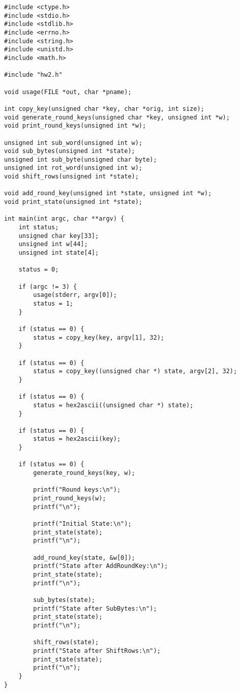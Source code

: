 \documentclass[a4paper]{report}
\begin{document}
\begin{lstlisting}
#include <ctype.h>
#include <stdio.h>
#include <stdlib.h>
#include <errno.h>
#include <string.h>
#include <unistd.h>
#include <math.h>

#include "hw2.h"

void usage(FILE *out, char *pname);

int copy_key(unsigned char *key, char *orig, int size);
void generate_round_keys(unsigned char *key, unsigned int *w);
void print_round_keys(unsigned int *w);

unsigned int sub_word(unsigned int w);
void sub_bytes(unsigned int *state);
unsigned int sub_byte(unsigned char byte);
unsigned int rot_word(unsigned int w);
void shift_rows(unsigned int *state);

void add_round_key(unsigned int *state, unsigned int *w);
void print_state(unsigned int *state);

int main(int argc, char **argv) {
    int status;
    unsigned char key[33];
    unsigned int w[44];
    unsigned int state[4];

    status = 0;

    if (argc != 3) {
        usage(stderr, argv[0]);
        status = 1;
    }

    if (status == 0) {
        status = copy_key(key, argv[1], 32);
    }

    if (status == 0) {
        status = copy_key((unsigned char *) state, argv[2], 32);
    }

    if (status == 0) {
        status = hex2ascii((unsigned char *) state);
    }

    if (status == 0) {
        status = hex2ascii(key);
    }

    if (status == 0) {
        generate_round_keys(key, w);

        printf("Round keys:\n");
        print_round_keys(w);
        printf("\n");

        printf("Initial State:\n");
        print_state(state);
        printf("\n");

        add_round_key(state, &w[0]);
        printf("State after AddRoundKey:\n");
        print_state(state);
        printf("\n");

        sub_bytes(state);
        printf("State after SubBytes:\n");
        print_state(state);
        printf("\n");

        shift_rows(state);
        printf("State after ShiftRows:\n");
        print_state(state);
        printf("\n");
    }
}


\end{lstlisting}
\end{document}

